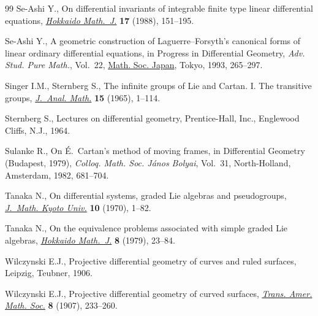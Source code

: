 \documentclass[pdftex]{sigma}%
\numberwithin{equation}{section}
\begin{document}
\begin{thebibliography}{99}
Se-Ashi Y., On differential invariants of integrable finite type linear
 differential equations, \href{https://doi.org/10.14492/hokmj/1381517803}{\textit{Hokkaido Math.~J.}} \textbf{17} (1988),
 151--195.

Se-Ashi Y., A geometric construction of {L}aguerre--{F}orsyth's canonical forms
 of linear ordinary differential equations, in Progress in Differential
 Geometry, \textit{Adv. Stud. Pure Math.}, Vol.~22, \href{https://doi.org/10.2969/aspm/02210265}{Math. Soc. Japan}, Tokyo,
 1993, 265--297.

Singer I.M., Sternberg S., The infinite groups of {L}ie and {C}artan. {I}.
 {T}he transitive groups, \href{https://doi.org/10.1007/BF02787690}{\textit{J.~Anal. Math.}} \textbf{15} (1965), 1--114.

Sternberg S., Lectures on differential geometry, Prentice-Hall, Inc., Englewood
 Cliffs, N.J., 1964.

Sulanke R., On \'E.~{C}artan's method of moving frames, in Differential
 Geometry ({B}udapest, 1979), \textit{Colloq. Math. Soc. J\'anos Bolyai},
 Vol.~31, North-Holland, Amsterdam, 1982, 681--704.

Tanaka N., On differential systems, graded {L}ie algebras and pseudogroups,
 \href{https://doi.org/10.1215/kjm/1250523814}{\textit{J.~Math. Kyoto Univ.}} \textbf{10} (1970), 1--82.

Tanaka N., On the equivalence problems associated with simple graded {L}ie
 algebras, \href{https://doi.org/10.14492/hokmj/1381758416}{\textit{Hokkaido Math.~J.}} \textbf{8} (1979), 23--84.

Wilczynski E.J., Projective differential geometry of curves and ruled surfaces,
 Leipzig, Teubner, 1906.

Wilczynski E.J., Projective differential geometry of curved surfaces,
 \href{https://doi.org/10.2307/1986347}{\textit{Trans. Amer. Math. Soc.}} \textbf{8} (1907), 233--260.

\end{thebibliography}\LastPageEnding
\end{document}
